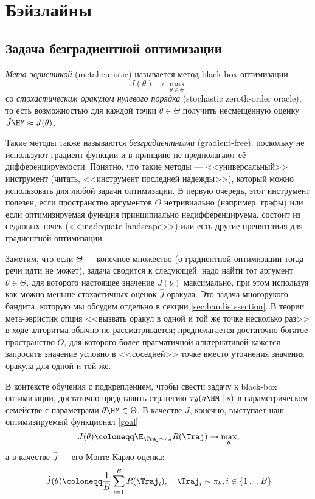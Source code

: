 \section{Бэйзлайны}

\subsection{Задача безградиентной оптимизации}

\begin{definition}
\emph{Мета-эвристикой} (metaheuristic) называется метод black-box оптимизации
$$J(\theta) \to \max_{\theta \in \Theta}$$
со \emph{стохастическим оракулом нулевого порядка} (stochastic zeroth-order oracle), то есть возможностью для каждой точки $\theta \in \Theta$ получить несмещённую оценку $\hat{J} \HM\approx J(\theta)$.
\end{definition}

Такие методы также называются \emph{безградиентными} (gradient-free), поскольку не используют градиент функции и в принципе не предполагают её дифференцируемости. Понятно, что такие методы --- <<универсальный>> инструмент (читать, <<инструмент последней надежды>>), который можно использовать для любой задачи оптимизации. В первую очередь, этот инструмент полезен, если пространство аргументов $\Theta$ нетривиально (например, графы) или если оптимизируемая функция принципиально недифференцируема, состоит из седловых точек (<<inadequate landscape>>) или есть другие препятствия для градиентной оптимизации.

Заметим, что если $\Theta$ --- конечное множество (о градиентной оптимизации тогда речи идти не может), задача сводится к следующей: надо найти тот аргумент $\theta \in \Theta$, для которого настоящее значение $J(\theta)$ максимально, при этом используя как можно меньше стохастичных оценок $\hat{J}$ оракула. Это задача многорукого бандита, которую мы обсудим отдельно в секции \ref{sec:bandistssection}. В теории мета-эвристик опция <<вызвать оракул в одной и той же точке несколько раз>> в ходе алгоритма обычно не рассматривается; предполагается достаточно богатое пространство $\Theta$, для которого более прагматичной альтернативой кажется запросить значение условно в <<соседней>> точке вместо уточнения значения оракула для одной и той же.

В контексте обучения с подкреплением, чтобы свести задачу к black-box оптимизации, достаточно представить стратегию $\pi_\theta(a \HM\mid s)$ в параметрическом семействе с параметрами $\theta \HM\in \Theta$. В качестве $J$, конечно, выступает наш оптимизируемый функционал \eqref{goal}
$$J(\theta) \coloneqq \E_{\Traj \sim \pi_\theta} R(\Traj) \to \max_{\theta},$$
а в качестве $\hat{J}$ --- его Монте-Карло оценка:
$$\hat{J}(\theta) \coloneqq \frac{1}{B}\sum_{i=1}^{B} R(\Traj_i), \quad \Traj_i \sim \pi_\theta, i \in \{1 \dots B \}$$

